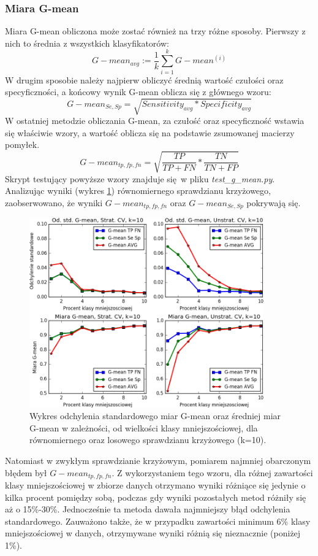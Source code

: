 \subsubsection{Miara G-mean}
Miara G-mean obliczona może zostać również na trzy różne sposoby. Pierwszy z nich to średnia z wszystkich klasyfikatorów:
\[G-mean_{avg} := \frac{1}{k} \sum_{i=1}^{k} G-mean^{(i)} \]
W drugim sposobie należy najpierw obliczyć średnią wartość czułości oraz specyficzności, a końcowy wynik G-mean oblicza się z głównego wzoru:
\[G-mean_{Se, Sp} = \sqrt{Sensitivity_{avg}*Specificity_{avg}} \]
W ostatniej metodzie obliczania G-mean, za czułość oraz specyficzność wstawia się właściwie wzory, a wartość oblicza się na podstawie zsumowanej macierzy pomyłek.
\[G-mean_{tp, fp, fn} = \sqrt{\frac{TP}{TP + FN}*\frac{TN}{TN + FP}} \]
Skrypt testujący powyższe wzory znajduje się w pliku \textit{test\_g\_mean.py}. Analizując wyniki (wykres \ref{fig:wykresgmean}) równomiernego sprawdzianu krzyżowego, zaobserwowano, że  wyniki $G-mean_{tp, fp, fn}$ oraz $G-mean_{Se, Sp}$ pokrywają się.
\begin{figure}[H]
	\centering
	\includegraphics[width=0.9\textwidth]{./images/miara-G-mean.png}
	\caption[Odchylenie standardowe oraz średnia miar G-mean dla sprawdzianu krzyżowego]{Wykres odchylenia standardowego miar G-mean oraz średniej miar G-mean w zależności, od wielkości klasy mniejszościowej, dla równomiernego oraz losowego sprawdzianu krzyżowego (k=10).}
	\label{fig:wykresgmean}
\end{figure}
Natomiast w zwykłym sprawdzianie krzyżowym, pomiarem najmniej obarczonym błędem był $G-mean_{tp, fp, fn}$. Z wykorzystaniem tego wzoru, dla różnej zawartości klasy mniejszościowej w zbiorze danych otrzymano wyniki różniące się jedynie o kilka procent pomiędzy sobą, podczas gdy wyniki pozostałych metod różniły się aż o 15\%-30\%. Jednocześnie ta metoda dawała najmniejszy błąd odchylenia standardowego. Zauważono także, że w przypadku zawartości minimum 6\% klasy mniejszościowej w danych, otrzymywane wyniki różnią się nieznacznie (poniżej 1\%).

